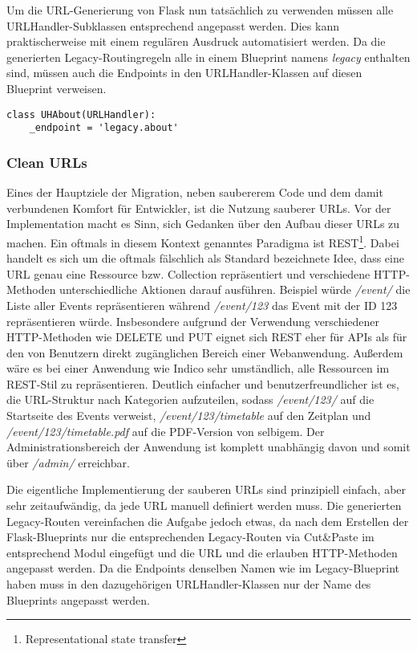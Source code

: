 Um die URL-Generierung von Flask nun tatsächlich zu verwenden müssen alle URLHandler-Subklassen
entsprechend angepasst werden. Dies kann praktischerweise mit einem regulären Ausdruck automatisiert
werden. Da die generierten Legacy-Routingregeln alle in einem Blueprint namens \emph{legacy}
enthalten sind, müssen auch die Endpoints in den URLHandler-Klassen auf diesen Blueprint verweisen.

\begin{lstlisting}[caption=Endpointbasierter URLHandler für about.py]
class UHAbout(URLHandler):
    _endpoint = 'legacy.about'
\end{lstlisting}


\subsubsection{Clean URLs}

Eines der Hauptziele der Migration, neben saubererem Code und dem damit verbundenen Komfort für
Entwickler, ist die Nutzung sauberer URLs. Vor der Implementation macht es Sinn, sich Gedanken über
den Aufbau dieser URLs zu machen. Ein oftmals in diesem Kontext genanntes Paradigma ist
REST\footnote{Representational state transfer}. Dabei handelt es sich um die oftmals fälschlich als
Standard bezeichnete Idee, dass eine URL genau eine Ressource bzw. Collection repräsentiert und
verschiedene HTTP-Methoden unterschiedliche Aktionen darauf ausführen. Beispiel würde \emph{/event/}
die Liste aller Events repräsentieren während \emph{/event/123} das Event mit der ID 123
repräsentieren würde. Insbesondere aufgrund der Verwendung verschiedener HTTP-Methoden wie DELETE
und PUT eignet sich REST eher für APIs als für den von Benutzern direkt zugänglichen Bereich einer
Webanwendung. Außerdem wäre es bei einer Anwendung wie Indico sehr umständlich, alle Ressourcen im
REST-Stil zu repräsentieren. Deutlich einfacher und benutzerfreundlicher ist es, die URL-Struktur
nach Kategorien aufzuteilen, sodass \emph{/event/123/} auf die Startseite des Events verweist,
\emph{/event/123/timetable} auf den Zeitplan und \emph{/event/123/timetable.pdf} auf die PDF-Version
von selbigem. Der Administrationsbereich der Anwendung ist komplett unabhängig davon und somit über
\emph{/admin/} erreichbar.

Die eigentliche Implementierung der sauberen URLs sind prinzipiell einfach, aber sehr zeitaufwändig,
da jede URL manuell definiert werden muss. Die generierten Legacy-Routen vereinfachen die Aufgabe
jedoch etwas, da nach dem Erstellen der Flask-Blueprints nur die entsprechenden Legacy-Routen via
Cut\&Paste im entsprechend Modul eingefügt und die URL und die erlauben HTTP-Methoden angepasst
werden. Da die Endpoints denselben Namen wie im Legacy-Blueprint haben muss in den dazugehörigen
URLHandler-Klassen nur der Name des Blueprints angepasst werden.


